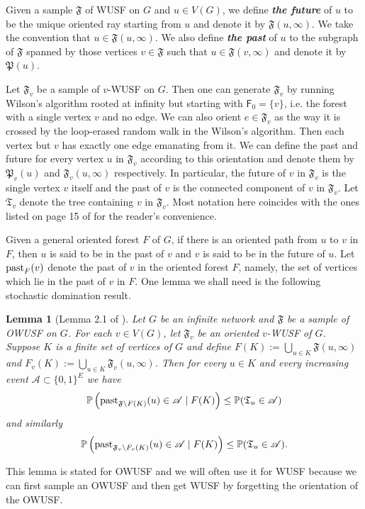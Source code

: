 \documentclass[12pt]{article}
\newtheorem{lemma}[theorem]{Lemma}
\numberwithin{equation}{section}
\newcommand{\be}{\begin{equation}}
\newcommand{\ee}{\end{equation}}
\newcommand{\1}{\mathbf{1}}
\newcommand{\notion}[1]{{\bf  \textit{#1}}}
\begin{document}
 Given a sample $\mathfrak{F}$ of WUSF on $G$ and $u\in V(G)$,  we define \notion{the future} of $u$ to be the unique oriented ray starting from $u$ and denote it by $\mathfrak{F}(u,\infty)$. We take the convention that $u\in\mathfrak{F}(u,\infty)$. We also define \notion{the past} of $u$ to the subgraph of $\mathfrak{F}$ spanned by those vertices  $v\in\mathfrak{F}$ such that $u\in\mathfrak{F}(v,\infty)$ and denote it by $\mathfrak{P}(u)$. 
 
 
 
 Let $\mathfrak{F}_v$ be a sample of $v$-WUSF on $G$. Then one can generate $\mathfrak{F}_v$ by running Wilson's algorithm rooted at infinity but starting with $\mathsf{F}_0=\{v\}$, i.e. the forest with a single vertex $v$ and no edge. We can also orient $e\in\mathfrak{F}_v$ as the way it is crossed by the loop-erased random walk in the Wilson's algorithm. Then each vertex but $v$ has exactly one edge emanating from it. We can define the past and future for every vertex $u$ in $\mathfrak{F}_v$ according to this orientation and denote them by $\mathfrak{P}_v(u)$ and $\mathfrak{F}_v(u,\infty)$ respectively. In particular, the future of $v$ in $\mathfrak{F}_v$ is the single vertex $v$ itself and the past of $v$ is the connected component of $v$ in $\mathfrak{F}_v$. Let $\mathfrak{T}_v$ denote the tree containing $v$ in $\mathfrak{F}_v$. Most notation here coincides with the ones listed on page 15 of  \cite{Hutchcroft2018a} for the reader's convenience. 
 
  Given a general oriented forest $F$ of $G$, if there is an oriented path from $u$ to $v$ in $F$, then $u$ is said to be in the past of $v$ and $v$ is said to be in the future of $u$. Let $\textnormal{past}_F(v)$ denote the past of $v$ in the oriented forest $F$, namely, the set of vertices which lie in the past of $v$ in $F$. One lemma we shall need is the following stochastic domination result.
 
 \begin{lemma}[Lemma 2.1 of \cite{Hutchcroft2018a}]\label{lem:stochastic domination}
 	Let $G$ be an infinite network and $\mathfrak{F}$ be a sample of OWUSF on $G$. For each $v\in V(G)$, let $\mathfrak{F}_v$ be an oriented $v$-WUSF of $G$. Suppose $K$ is a finite set of vertices of $G$ and define $F(K):=\bigcup_{u\in K}\mathfrak{F}(u,\infty)$ and $F_v(K):=\bigcup_{u\in K}\mathfrak{F}_v(u,\infty)$. Then for every $u\in K$ and every increasing event $\mathscr{A}\subset \{0,1\}^E$ we have 
 	\be\label{eq:SD 1}
 	\mathbb{P}\left( \textnormal{past}_{\mathfrak{F}\backslash F(K)}(u)\in\mathscr{A}\mid F(K)\right)
 	\leq \mathbb{P}(\mathfrak{T}_u\in\mathscr{A})
 	\ee
 	and similarly
 	\be\label{eq:SD 2}
 	\mathbb{P}\left( \textnormal{past}_{\mathfrak{F}_v\backslash F_v(K)}(u)\in\mathscr{A}\mid F(K)\right)
 	\leq \mathbb{P}(\mathfrak{T}_u\in\mathscr{A}).
 	\ee
 \end{lemma}
 This lemma is stated for OWUSF and we will often use it for WUSF because we can first sample an OWUSF and then get WUSF by forgetting the orientation of the OWUSF.  
 
\end{document}
